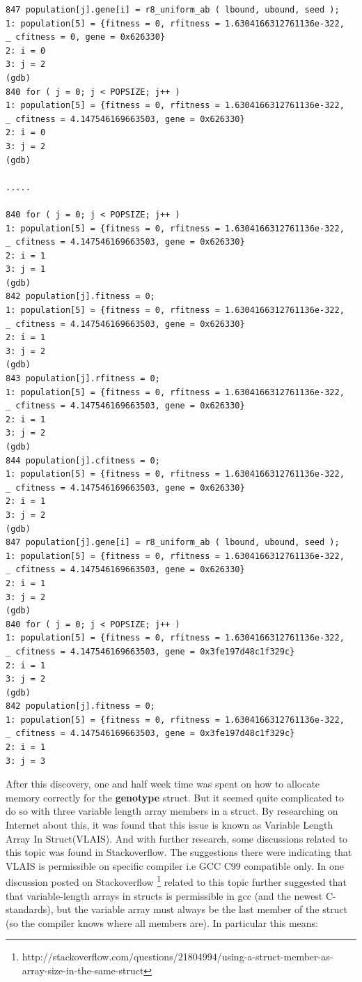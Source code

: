 \begin{lstlisting}[style=BashInputStyle, label={lst:gdb_output}]
847 population[j].gene[i] = r8_uniform_ab ( lbound, ubound, seed );
1: population[5] = {fitness = 0, rfitness = 1.6304166312761136e-322, 
_ cfitness = 0, gene = 0x626330}
2: i = 0
3: j = 2
(gdb) 
840 for ( j = 0; j < POPSIZE; j++ )
1: population[5] = {fitness = 0, rfitness = 1.6304166312761136e-322, 
_ cfitness = 4.147546169663503, gene = 0x626330}
2: i = 0
3: j = 2
(gdb) 

.....

840 for ( j = 0; j < POPSIZE; j++ )
1: population[5] = {fitness = 0, rfitness = 1.6304166312761136e-322, 
_ cfitness = 4.147546169663503, gene = 0x626330}
2: i = 1
3: j = 1
(gdb) 
842 population[j].fitness = 0;
1: population[5] = {fitness = 0, rfitness = 1.6304166312761136e-322, 
_ cfitness = 4.147546169663503, gene = 0x626330}
2: i = 1
3: j = 2
(gdb) 
843 population[j].rfitness = 0;
1: population[5] = {fitness = 0, rfitness = 1.6304166312761136e-322, 
_ cfitness = 4.147546169663503, gene = 0x626330}
2: i = 1
3: j = 2
(gdb) 
844 population[j].cfitness = 0;
1: population[5] = {fitness = 0, rfitness = 1.6304166312761136e-322, 
_ cfitness = 4.147546169663503, gene = 0x626330}
2: i = 1
3: j = 2
(gdb) 
847 population[j].gene[i] = r8_uniform_ab ( lbound, ubound, seed );
1: population[5] = {fitness = 0, rfitness = 1.6304166312761136e-322, 
_ cfitness = 4.147546169663503, gene = 0x626330}
2: i = 1
3: j = 2
(gdb) 
840 for ( j = 0; j < POPSIZE; j++ )
1: population[5] = {fitness = 0, rfitness = 1.6304166312761136e-322, 
_ cfitness = 4.147546169663503, gene = 0x3fe197d48c1f329c}
2: i = 1
3: j = 2
(gdb) 
842 population[j].fitness = 0;
1: population[5] = {fitness = 0, rfitness = 1.6304166312761136e-322, 
_ cfitness = 4.147546169663503, gene = 0x3fe197d48c1f329c}
2: i = 1
3: j = 3
\end{lstlisting}

After this discovery, one and half week time was spent on how to allocate memory correctly for the \textbf{genotype} struct. But it seemed quite complicated to do so with three variable length array members in a struct. By researching on Internet about this, it was found that this issue is known as Variable Length Array In Struct(VLAIS). And with further research, some discussions related to this topic was found in Stackoverflow. The suggestions there were indicating that VLAIS is permissible on specific compiler i.e GCC C99 compatible only.  In one discussion posted on Stackoverflow \footnote{http://stackoverflow.com/questions/21804994/using-a-struct-member-as-array-size-in-the-same-struct} related to this topic further suggested that that variable-length arrays in structs is permissible in gcc (and the newest C-standards), but the variable array must always be the last member of the struct (so the compiler knows where all members are). In particular this means:


